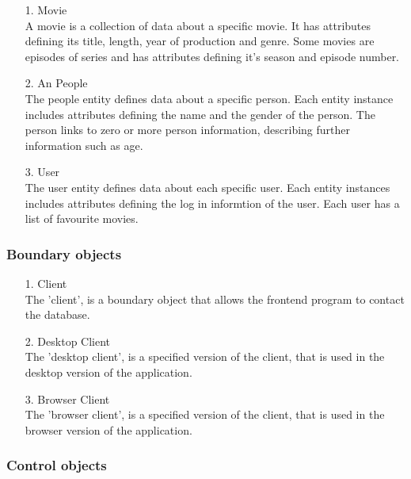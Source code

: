 \begin{enumerate}
	\item[1.] Movie \hfill \\
	A movie is a collection of data about a specific movie. It has attributes defining its title, length, year of production and genre. Some movies are episodes of series and has attributes defining it's season and episode number.
	
	\item[2.] An People \hfill \\
	The people entity defines data about a specific person. Each entity instance includes attributes defining the name and the gender of the person. The person links to zero or more person information, describing further information such as age.
	
	\item[3.] User \hfill \\
	The user entity defines data about each specific user. Each entity instances includes attributes defining the log in informtion of the user. Each user has a list of favourite movies.
	
\end{enumerate}

\subsubsection{Boundary objects}

\begin{enumerate}

	\item[1.] Client \hfill \\
	The 'client', is a boundary object that allows the frontend program to contact the database. 

	\item[2.] Desktop Client \hfill \\
	The 'desktop client', is a specified version of the client, that is used in the desktop version of the application.
	
	\item[3.] Browser Client \hfill \\
	The 'browser client', is a specified version of the client, that is used in the browser version of the application.
	
\end{enumerate}

\subsubsection{Control objects}

